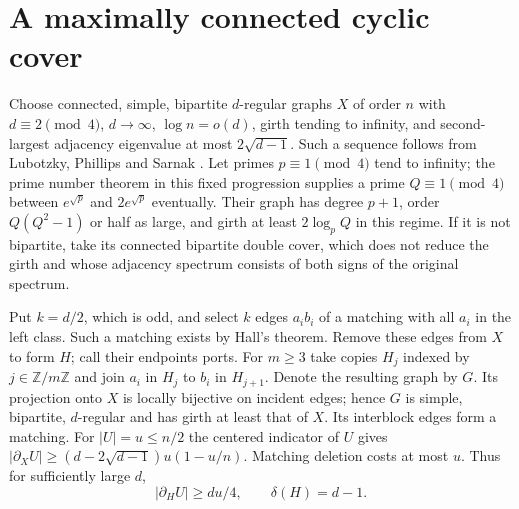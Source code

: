 \documentclass[11pt]{article}
\begin{document}
\section{A maximally connected cyclic cover}
Choose connected, simple, bipartite $d$-regular graphs $X$ of order $n$ with $d\equiv2\pmod4$, $d\to\infty$, $\log n=o(d)$, girth tending to infinity, and second-largest adjacency eigenvalue at most $2\sqrt{d-1}$. Such a sequence follows from Lubotzky, Phillips and Sarnak \cite[Theorems 3.4 and 4.1]{LPS}. Let primes $p\equiv1\pmod4$ tend to infinity; the prime number theorem in this fixed progression supplies a prime $Q\equiv1\pmod4$ between $e^{\sqrt p}$ and $2e^{\sqrt p}$ eventually. Their graph has degree $p+1$, order $Q(Q^2-1)$ or half as large, and girth at least $2\log_p Q$ in this regime. If it is not bipartite, take its connected bipartite double cover, which does not reduce the girth and whose adjacency spectrum consists of both signs of the original spectrum.

Put $k=d/2$, which is odd, and select $k$ edges $a_ib_i$ of a matching with all $a_i$ in the left class. Such a matching exists by Hall's theorem. Remove these edges from $X$ to form $H$; call their endpoints ports. For $m\ge3$ take copies $H_j$ indexed by $j\in\mathbb Z/m\mathbb Z$ and join $a_i$ in $H_j$ to $b_i$ in $H_{j+1}$. Denote the resulting graph by $G$. Its projection onto $X$ is locally bijective on incident edges; hence $G$ is simple, bipartite, $d$-regular and has girth at least that of $X$. Its interblock edges form a matching. For $|U|=u\le n/2$ the centered indicator of $U$ gives $|\partial_XU|\ge(d-2\sqrt{d-1})u(1-u/n)$. Matching deletion costs at most $u$. Thus for sufficiently large $d$,
\begin{equation}\label{expand}
  |\partial_H U|\ge du/4,\qquad \delta(H)=d-1.
\end{equation}
\end{document}
